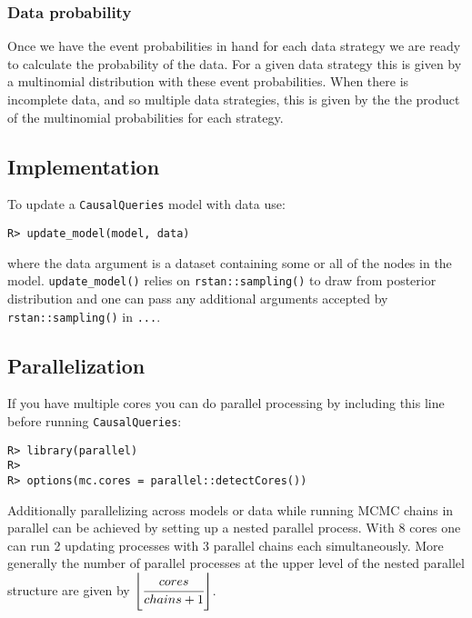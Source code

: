 \documentclass[
  11pt,
  article]{jss}
\begin{document}
\hypertarget{data-probability}{%
\subsubsection{Data probability}\label{data-probability}}

Once we have the event probabilities in hand for each data strategy we
are ready to calculate the probability of the data. For a given data
strategy this is given by a multinomial distribution with these event
probabilities. When there is incomplete data, and so multiple data
strategies, this is given by the the product of the multinomial
probabilities for each strategy.

\hypertarget{implementation}{%
\subsection{Implementation}\label{implementation}}

To update a \texttt{CausalQueries} model with data use:

\begin{verbatim}
R> update_model(model, data)
\end{verbatim}

where the data argument is a dataset containing some or all of the nodes
in the model. \texttt{update\_model()} relies on
\texttt{rstan::sampling()} to draw from posterior distribution and one
can pass any additional arguments accepted by \texttt{rstan::sampling()}
in \texttt{...}.

\hypertarget{parallelization}{%
\subsection{Parallelization}\label{parallelization}}

If you have multiple cores you can do parallel processing by including
this line before running \texttt{CausalQueries}:

\begin{verbatim}
R> library(parallel)
R> 
R> options(mc.cores = parallel::detectCores())
\end{verbatim}

Additionally parallelizing across models or data while running MCMC
chains in parallel can be achieved by setting up a nested parallel
process. With 8 cores one can run 2 updating processes with 3 parallel
chains each simultaneously. More generally the number of parallel
processes at the upper level of the nested parallel structure are given
by \(\left \lfloor \cfrac{cores}{chains + 1} \right \rfloor\).
\end{document}
